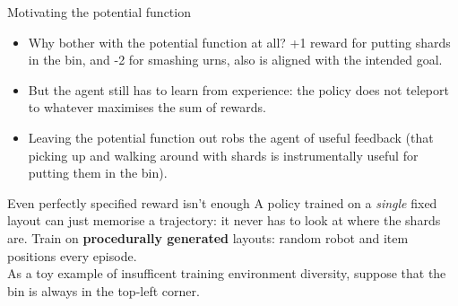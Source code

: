 


\begin{frame}{Motivating the potential function}
\begin{itemize}
  \item Why bother with the potential function at all? +1 reward for putting shards in
  the bin, and -2 for smashing urns, also is aligned with the intended goal.
  \item But the agent still has to learn from experience: the policy does not
  teleport to whatever maximises the sum of rewards.
  \item Leaving the potential function out robs the agent of useful feedback (that picking up
  and walking around with shards is instrumentally useful for putting them in the bin).
\end{itemize}
\end{frame}

\begin{frame}{}
  \begin{center}
    \end{center}
\end{frame}


\begin{frame}{Even perfectly specified reward isn't enough}
A policy trained on a \emph{single} fixed layout can just memorise a trajectory: it never has to look at where the shards are.
\vfill
Train on \textbf{procedurally generated} layouts: random robot and item positions every episode. \\
As a toy example of insufficent training environment diversity, suppose that the bin is always in the top-left corner.
\begin{center}
\end{center}
\end{frame}

